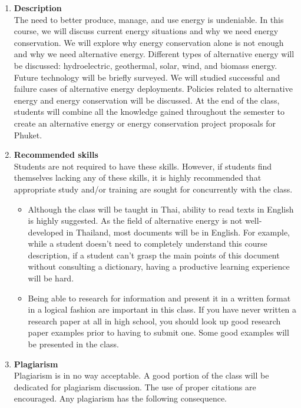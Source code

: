 \documentclass[a4paper,12pt]{article}
\begin{document}
\begin{enumerate}[label=\textbf{\Alph*}]
    \item \textbf{Description} \hfill \\
    The need to better produce, manage, and use energy is undeniable. In this course, we will discuss current energy situations and why we need energy conservation. We will explore why energy conservation alone is not enough and why we need alternative energy. Different types of alternative energy will be discussed: hydroelectric, geothermal, solar, wind, and biomass energy. Future technology will be briefly surveyed. We will studied successful and failure cases of alternative energy deployments. Policies related to alternative energy and energy conservation will be discussed. At the end of the class, students will combine all the knowledge gained throughout the semester to create an alternative energy or energy conservation project proposals for Phuket.
    \item \textbf{Recommended skills} \hfill \\
        Students are not required to have these skills. However, if students find themselves lacking any of these skills, it is highly recommended that appropriate study and/or training are sought for concurrently with the class.
        \begin{itemize}
            \item Although the class will be taught in Thai, ability to read texts in English is highly suggested. As the field of alternative energy is not well-developed in Thailand, most documents will be in English. For example, while a student doesn't need to completely understand this course description, if a student can't grasp the main points of this document without consulting a dictionary, having a productive learning experience will be hard. 
            \item Being able to research for information and present it in a written format in a logical fashion are important in this class. If you have never written a research paper at all in high school, you should look up good research paper examples prior to having to submit one. Some good examples will be presented in the class.
        \end{itemize}
    \item \textbf{Plagiarism} \hfill \\
        Plagiarism is in no way acceptable. A good portion of the class will be dedicated for plagiarism discussion. The use of proper citations are encouraged. Any plagiarism has the following consequence.

\end{enumerate}
\end{document}
